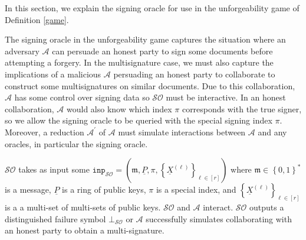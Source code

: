 \documentclass{mrl}
\theoremstyle{definition}
\numberwithin{theorem}{subsection}
\newcommand{\adversary}{\mathcal{A}}
\newcommand{\m}{\mathfrak{m}}
\begin{document}
In this section, we explain the signing oracle for use in the unforgeability game of Definition \ref{game}.

The signing oracle in the unforgeability game captures the situation where an adversary $\adversary$ can persuade an honest party to sign some documents before attempting a forgery. In the multisignature case, we must also capture the implications of a malicious $\adversary$ persuading an honest party to collaborate to construct some multisignatures on similar documents. Due to this collaboration, $\adversary$ has some control over signing data so $\mathcal{SO}$ must be interactive.  In an honest collaboration, $\adversary$ would also know which index $\pi$ corresponds with the true signer, so we allow the signing oracle to be queried with the special signing index $\pi$. Moreover, a reduction $\adversary^\prime$ of $\adversary$ must simulate interactions between $\adversary$ and any oracles, in particular the signing oracle.

$\mathcal{SO}$ takes as input some $\texttt{inp}_{\mathcal{SO}} = (\m, \underline{P}, \pi, \left\{\underline{X}^{(\ell)}\right\}_{\ell \in [r]})$ where $\m \in \left\{0,1\right\}^*$ is a message, $\underline{P}$ is a ring of public keys, $\pi$ is a special index, and $\left\{\underline{X}^{(\ell)}\right\}_{\ell \in [r]}$ is a a multi-set of multi-sets of public keys. $\mathcal{SO}$ and $\adversary$ interact. $\mathcal{SO}$ outputs a distinguished failure symbol $\bot_{\mathcal{SO}}$ or $\adversary$ successfully simulates collaborating with an honest party to obtain a multi-signature.
\end{document}
